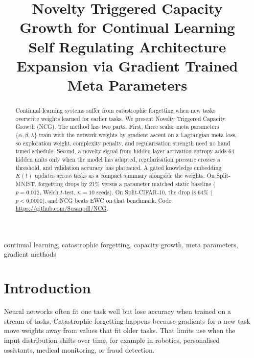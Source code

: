 \documentclass[conference]{IEEEtran}
\begin{document}
\title{Novelty Triggered Capacity Growth for Continual Learning\\
{\large Self Regulating Architecture Expansion via Gradient Trained Meta Parameters}}

\author{
}

\maketitle

\begin{abstract}
Continual learning systems suffer from catastrophic forgetting when new tasks overwrite weights learned for earlier tasks. We present Novelty Triggered Capacity Growth (NCG). The method has two parts. First, three scalar meta parameters $\{\alpha, \beta, \lambda\}$ train with the network weights by gradient ascent on a Lagrangian meta loss, so exploration weight, complexity penalty, and regularisation strength need no hand tuned schedule. Second, a novelty signal from hidden layer activation entropy adds 64 hidden units only when the model has adapted, regularisation pressure crosses a threshold, and validation accuracy has plateaued. A gated knowledge embedding $K(t)$ updates across tasks as a compact summary alongside the weights. On Split-MNIST, forgetting drops by 21\% versus a parameter matched static baseline ($p = 0.012$, Welch $t$-test, $n = 10$ seeds). On Split-CIFAR-10, the drop is 64\% ($p < 0.0001$), and NCG beats EWC on that benchmark. Code: \url{https://github.com/Susanpdl/NCG}.
\end{abstract}

\begin{IEEEkeywords}
continual learning, catastrophic forgetting, capacity growth, meta parameters, gradient methods
\end{IEEEkeywords}

\section{Introduction}
Neural networks often fit one task well but lose accuracy when trained on a stream of tasks. Catastrophic forgetting \cite{mccloskey1989,french1999} happens because gradients for a new task move weights away from values that fit older tasks. That limits use when the input distribution shifts over time, for example in robotics, personalised assistants, medical monitoring, or fraud detection.
\end{document}
